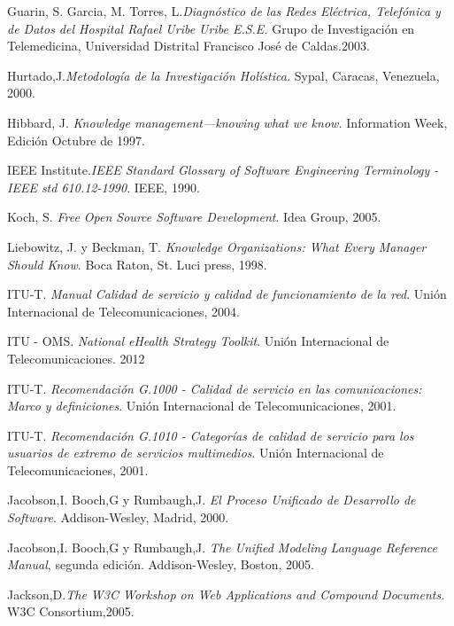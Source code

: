 \begin{thebibliography}{}
 Guarin, S. Garcia, M. Torres, L.\textit{Diagnóstico de las Redes Eléctrica, Telefónica y de Datos del Hospital Rafael Uribe Uribe E.S.E.} Grupo de Investigación en Telemedicina,  Universidad Distrital Francisco José de Caldas.2003.

 Hurtado,J.\textit{Metodología de la Investigación Holística.} Sypal, Caracas, Venezuela, 2000.

 Hibbard, J. \textit{Knowledge management—knowing what we know.} Information Week, Edición Octubre de 1997.

 IEEE Institute.\textit{IEEE Standard Glossary of Software Engineering Terminology - IEEE std 610.12-1990}. IEEE, 1990.

 Koch, S. \textit{Free Open Source Software Development}. Idea Group, 2005.

 Liebowitz, J. y Beckman, T. \textit{Knowledge Organizations: What Every Manager Should Know}. Boca Raton, St. Luci press, 1998.

 ITU-T. \textit{Manual Calidad de servicio y calidad de funcionamiento de la red}. Unión Internacional de Telecomunicaciones, 2004.

 ITU - OMS. \textit{National eHealth Strategy Toolkit}. Unión Internacional de Telecomunicaciones. 2012 


 ITU-T. \textit{Recomendación G.1000 - Calidad de servicio en las comunicaciones: Marco y definiciones}. Unión Internacional de Telecomunicaciones, 2001.

 ITU-T. \textit{Recomendación G.1010 - Categorías de calidad de servicio para los usuarios de extremo de servicios multimedios}. Unión Internacional de Telecomunicaciones, 2001.

 Jacobson,I. Booch,G y Rumbaugh,J. \textit{El Proceso Unificado de Desarrollo de Software}. Addison-Wesley, Madrid, 2000.

 Jacobson,I. Booch,G y Rumbaugh,J. \textit{The Unified Modeling Language Reference Manual}, segunda edición. Addison-Wesley, Boston, 2005.

 Jackson,D.\textit{The W3C Workshop on Web Applications and Compound Documents}. W3C Consortium,2005.


\end{thebibliography}
